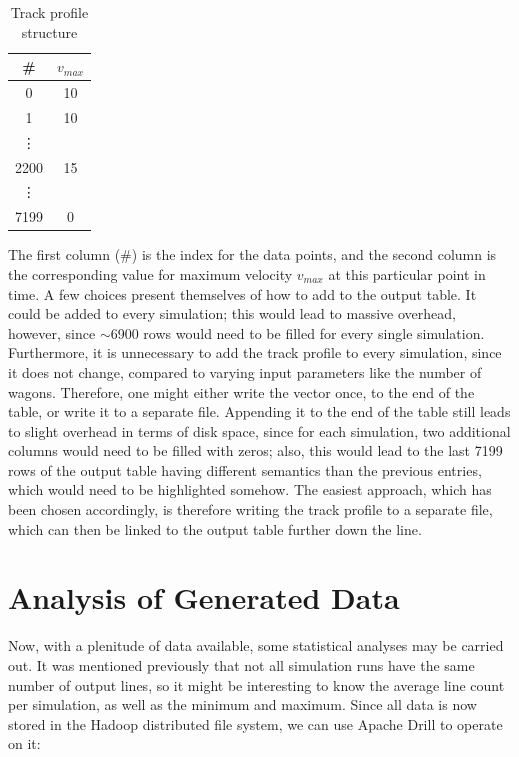 \bigskip
\begin{table}[htb!]
	\centering
	\begin{tabular}{*{2}{c}}\toprule
		\# & $v_{max}$ \\ \midrule
		0 & 10 \\
		1 & 10 \\
		\vdots & \\
		2200 & 15 \\
		\vdots & \\
		7199 & 0 \\ 
	\end{tabular}
	\caption{Track profile structure}
	\label{tab:trackprofile}
\end{table}

\noindent
The first column (\#) is the index for the data points, and the second column is the corresponding value for maximum velocity $v_{max}$ at this particular point in time. A few choices present themselves of how to add to the output table. It could be added to every simulation; this would lead to massive overhead, however, since $\sim$6900 rows would need to be filled for every single simulation. Furthermore, it is unnecessary to add the track profile to every simulation, since it does not change, compared to varying input parameters like the number of wagons. Therefore, one might either write the vector once, to the end of the table, or write it to a separate file. Appending it to the end of the table still leads to slight overhead in terms of disk space, since for each simulation, two additional columns would need to be filled with zeros; also, this would lead to the last 7199 rows of the output table having different semantics than the previous entries, which would need to be highlighted somehow. The easiest approach, which has been chosen accordingly, is therefore writing the track profile to a separate file, which can then be linked to the output table further down the line.

\section{Analysis of Generated Data}
\label{sec:AnalysisOfGeneratedData}
\par\noindent
Now, with a plenitude of data available, some statistical analyses may be carried out. It was mentioned previously that not all simulation runs have the same number of output lines, so it might be interesting to know the average line count per simulation, as well as the minimum and maximum. Since all data is now stored in the Hadoop distributed file system, we can use Apache Drill to operate on it:

